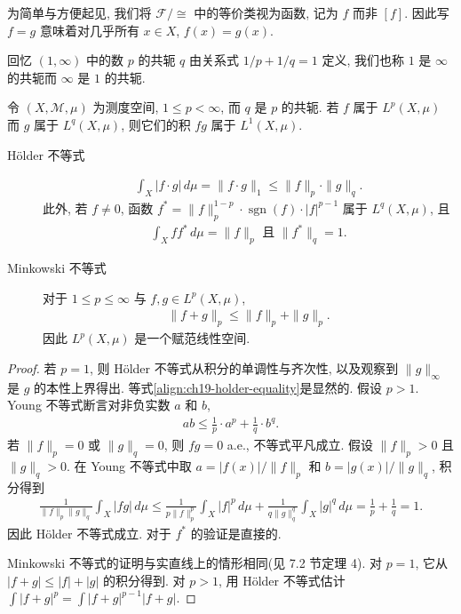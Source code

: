\documentclass[../../main.tex]{subfiles}
\begin{document}
为简单与方便起见, 我们将 $\mathcal{F}/\cong$ 中的等价类视为函数, 记为 $f$ 而非 $[f]$. 因此写 $f=g$ 意味着对几乎所有 $x\in X$, $f(x)=g(x)$.

回忆 $(1,\infty)$ 中的数 $p$ 的共轭 $q$ 由关系式 $1/p+1/q=1$ 定义, 我们也称 $1$ 是 $\infty$ 的共轭而 $\infty$ 是 $1$ 的共轭.

\begin{theorem}\label{theorem:ch19-holder-minkowski}
令 $(X,\mathcal{M},\mu)$ 为测度空间, $1\leqslant p<\infty$, 而 $q$ 是 $p$ 的共轭. 若 $f$ 属于 $L^{p}(X,\mu)$ 而 $g$ 属于 $L^{q}(X,\mu)$, 则它们的积 $fg$ 属于 $L^{1}(X,\mu)$.
\begin{description}
\item[H\"older 不等式]
\begin{align*}
\int_{X}|f\cdot g|\,d\mu=\|f\cdot g\|_{1}\leqslant\|f\|_{p}\cdot\|g\|_{q}.
\end{align*}
此外, 若 $f\neq 0$, 函数 $f^{*}=\|f\|_{p}^{1-p}\cdot\operatorname{sgn}(f)\cdot|f|^{p-1}$ 属于 $L^{q}(X,\mu)$, 且
\begin{align}
\int_{X}ff^{*}\,d\mu=\|f\|_{p}\text{ 且 }\|f^{*}\|_{q}=1.\label{align:ch19-holder-equality}
\end{align}
\item[Minkowski 不等式] 对于 $1\leqslant p\leqslant\infty$ 与 $f,g\in L^{p}(X,\mu)$,
\begin{align*}
\|f+g\|_{p}\leqslant\|f\|_{p}+\|g\|_{p}.
\end{align*}
因此 $L^{p}(X,\mu)$ 是一个赋范线性空间.
\end{description}
\end{theorem}

\begin{proof}
若 $p=1$, 则 H\"older 不等式从积分的单调性与齐次性, 以及观察到 $\|g\|_{\infty}$ 是 $g$ 的本性上界得出. 等式\eqref{align:ch19-holder-equality}是显然的. 假设 $p>1$. Young 不等式断言对非负实数 $a$ 和 $b$,
\begin{align*}
ab\leqslant\frac{1}{p}\cdot a^{p}+\frac{1}{q}\cdot b^{q}.
\end{align*}
若 $\|f\|_{p}=0$ 或 $\|g\|_{q}=0$, 则 $fg=0$ a.e., 不等式平凡成立. 假设 $\|f\|_{p}>0$ 且 $\|g\|_{q}>0$. 在 Young 不等式中取 $a=|f(x)|/\|f\|_{p}$ 和 $b=|g(x)|/\|g\|_{q}$, 积分得到
\begin{align*}
\frac{1}{\|f\|_{p}\|g\|_{q}}\int_{X}|fg|\,d\mu\leqslant\frac{1}{p\|f\|_{p}^{p}}\int_{X}|f|^{p}\,d\mu+\frac{1}{q\|g\|_{q}^{q}}\int_{X}|g|^{q}\,d\mu=\frac{1}{p}+\frac{1}{q}=1.
\end{align*}
因此 H\"older 不等式成立. 对于 $f^{*}$ 的验证是直接的.

Minkowski 不等式的证明与实直线上的情形相同(见 7.2 节定理 4). 对 $p=1$, 它从 $|f+g|\leqslant|f|+|g|$ 的积分得到. 对 $p>1$, 用 H\"older 不等式估计 $\int|f+g|^{p}=\int|f+g|^{p-1}|f+g|$.
\end{proof}
\end{document}
